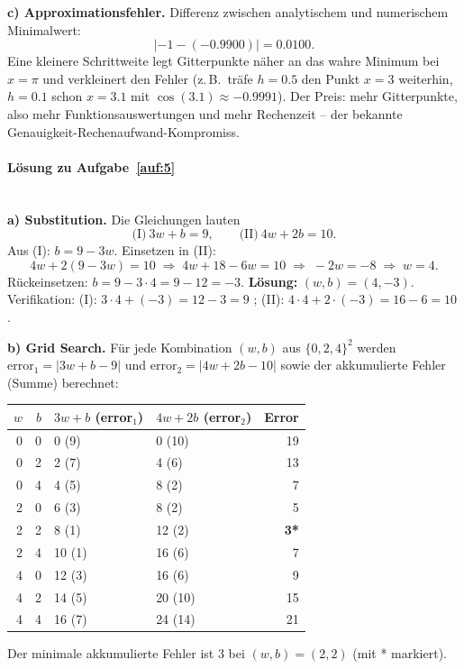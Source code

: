 \documentclass[11pt,a4paper]{scrartcl}
\begin{document}
\textbf{c) Approximationsfehler.} Differenz zwischen analytischem und numerischem
Minimalwert:
\[
\left| -1 - (-0.9900) \right| = 0.0100 .
\]
Eine kleinere Schrittweite legt Gitterpunkte näher an das wahre Minimum bei $x = \pi$ und
verkleinert den Fehler (z.\,B.\ träfe $h = 0.5$ den Punkt $x = 3$ weiterhin, $h = 0.1$
schon $x = 3.1$ mit $\cos(3.1) \approx -0.9991$). Der Preis: mehr Gitterpunkte, also mehr
Funktionsauswertungen und mehr Rechenzeit -- der bekannte Genauigkeit-Rechenaufwand-Kompromiss.

\paragraph{Lösung zu Aufgabe~\ref{auf:5}}\mbox{}\\[2pt]
\textbf{a) Substitution.} Die Gleichungen lauten
\[
\text{(I)}\ 3w + b = 9, \qquad \text{(II)}\ 4w + 2b = 10 .
\]
Aus (I): $b = 9 - 3w$. Einsetzen in (II):
\[
4w + 2(9 - 3w) = 10
\;\Rightarrow\;
4w + 18 - 6w = 10
\;\Rightarrow\;
-2w = -8
\;\Rightarrow\;
w = 4 .
\]
Rückeinsetzen: $b = 9 - 3 \cdot 4 = 9 - 12 = -3$.
\textbf{Lösung:} $(w, b) = (4, -3)$.
Verifikation: (I): $3 \cdot 4 + (-3) = 12 - 3 = 9$ \checkmark;\quad
(II): $4 \cdot 4 + 2 \cdot (-3) = 16 - 6 = 10$ \checkmark.

\textbf{b) Grid Search.} Für jede Kombination $(w,b)$ aus $\{0, 2, 4\}^2$ werden
$\text{error}_1 = |3w + b - 9|$ und $\text{error}_2 = |4w + 2b - 10|$ sowie der
akkumulierte Fehler (Summe) berechnet:
\begin{center}
\begin{tabular}{rrllr}
\toprule
$w$ & $b$ & $3w+b$ (error$_1$) & $4w+2b$ (error$_2$) & Error \\
\midrule
0 & 0 & 0 (9)   & 0 (10)  & 19 \\
0 & 2 & 2 (7)   & 4 (6)   & 13 \\
0 & 4 & 4 (5)   & 8 (2)   & 7 \\
2 & 0 & 6 (3)   & 8 (2)   & 5 \\
2 & 2 & 8 (1)   & 12 (2)  & \textbf{3*} \\
2 & 4 & 10 (1)  & 16 (6)  & 7 \\
4 & 0 & 12 (3)  & 16 (6)  & 9 \\
4 & 2 & 14 (5)  & 20 (10) & 15 \\
4 & 4 & 16 (7)  & 24 (14) & 21 \\
\bottomrule
\end{tabular}
\end{center}
Der minimale akkumulierte Fehler ist $3$ bei $(w, b) = (2, 2)$ (mit * markiert).
\end{document}
